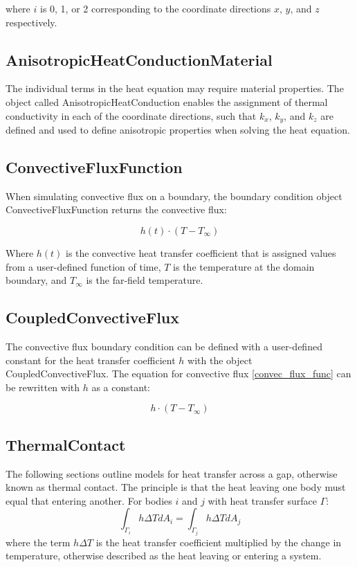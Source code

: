 \documentclass[preprint,5p]{elsarticle}
\begin{document}
where $i$ is 0, 1, or 2 corresponding to the coordinate directions $x$, $y$, and $z$ respectively.

\subsection{AnisotropicHeatConductionMaterial}
The individual terms in the heat equation may require material properties. The object called AnisotropicHeatConduction enables the assignment of thermal conductivity in each of the coordinate directions, such that $k_x$, $k_y$, and $k_z$ are defined and used to define anisotropic properties when solving the heat equation.

\subsection{ConvectiveFluxFunction}
When simulating convective flux on a boundary, the boundary condition object ConvectiveFluxFunction returns the convective flux:

\begin{equation}
\label{convec_flux_func}
h(t)\cdot(T-T_\infty)
\end{equation}

Where $h(t)$ is the convective heat transfer coefficient that is assigned values from a user-defined function of time, $T$ is the temperature at the domain boundary, and $T_\infty$ is the far-field temperature.

\subsection{CoupledConvectiveFlux}
The convective flux boundary condition can be defined with a user-defined constant for the heat transfer coefficient $h$ with the object CoupledConvectiveFlux. The equation for convective flux \ref{convec_flux_func} can be rewritten with $h$ as a constant:

\begin{equation}
\label{convec_flux_const}
h\cdot(T-T_\infty)
\end{equation}


\subsection{\textbf{ThermalContact}}
\label{thermalcontact}
The following sections outline models for heat transfer across a gap, otherwise known as thermal contact. The principle is that the heat leaving one body must equal that entering another.  For bodies $i$ and $j$ with heat transfer surface $\Gamma$:
\begin{equation*}
\int_{\Gamma_i} h \Delta T dA_i = \int_{\Gamma_j} h \Delta T dA_j
\end{equation*}
where the term $h \Delta T$ is the heat transfer coefficient multiplied by the change in temperature, otherwise described as the heat leaving or entering a system.
\end{document}
